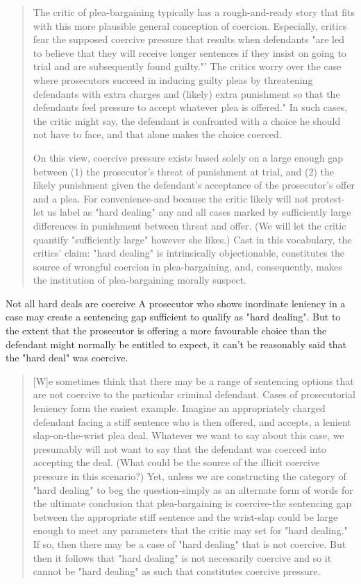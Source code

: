 \begin{quote}
    The critic of plea-bargaining typically has a rough-and-ready story that fits with this more plausible general conception of coercion. Especially, critics fear the supposed coercive pressure that results when defendants "are led to believe that they will receive longer sentences if they insist on going to trial and are subsequently found guilty."' The critics worry over the case where prosecutors succeed in inducing guilty pleas by threatening defendants with extra charges and (likely) extra punishment so that the defendants feel pressure to accept whatever plea is offered." In such cases, the critic might say, the defendant is confronted with a choice he should not have to face, and that alone makes the choice coerced.
    
    On this view, coercive pressure exists based solely on a large enough gap between (1) the prosecutor's threat of punishment at trial, and (2) the likely punishment given the defendant's acceptance of the prosecutor's offer and a plea. For convenience-and because the critic likely will not protest-let us label as "hard dealing" any and all cases marked by sufficiently large differences in punishment between threat and offer. (We will let the critic quantify "sufficiently large" however she likes.) Cast in this vocabulary, the critics' claim: "hard dealing" is intrinsically objectionable, constitutes the source of wrongful coercion in plea-bargaining, and, consequently, makes the institution of plea-bargaining morally suspect.
\end{quote}

Not all hard deals are coercive
A prosecutor who shows inordinate leniency in a case may create a sentencing gap sufficient to qualify as "hard dealing". But to the extent that the prosecutor is offering a more favourable choice than the defendant might normally be entitled to expect, it can't be reasonably said that the "hard deal" was coercive.

\begin{quote}
    [W]e sometimes think that there may be a range of sentencing options that are not coercive to the particular criminal defendant. Cases of prosecutorial leniency form the easiest example. Imagine an appropriately charged defendant facing a stiff sentence who is then offered, and accepts, a lenient slap-on-the-wrist plea deal. Whatever we want to say about this case, we presumably will not want to say that the defendant was coerced into accepting the deal. (What could be the source of the illicit coercive pressure in this scenario?) Yet, unless we are constructing the category of "hard dealing" to beg the question-simply as an alternate form of words for the ultimate conclusion that plea-bargaining is coercive-the sentencing gap between the appropriate stiff sentence and the wrist-slap could be large enough to meet any parameters that the critic may set for "hard dealing." If so, then there may be a case of "hard dealing" that is not coercive. But then it follows that "hard dealing" is not necessarily coercive and so it cannot be "hard dealing" as such that constitutes coercive pressure.
\end{quote}

